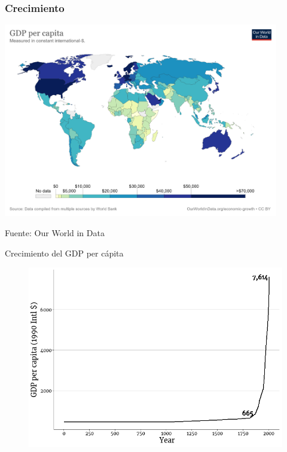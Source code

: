\documentclass{beamer}
\begin{document}
\begin{frame}
\frametitle{Crecimiento}
\begin{center}
    \href{https://ourworldindata.org/grapher/gdp-per-capita-worldbank} {\includegraphics[width=0.9\textwidth]{Slides Principios de Economia/Figures/gdppc2020.png}}
\end{center}
\small Fuente: Our World in Data
\end{frame}

\begin{frame}{Crecimiento del GDP per cápita}
    \begin{figure} [H]   \includegraphics[scale=0.5]{Slides Principios de Economia/Figures/C17.1.png}
\end{figure}
\end{frame}
\end{document}

